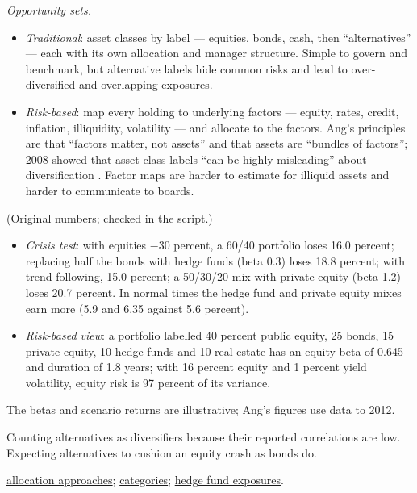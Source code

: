 \begin{qfdefinition}
\emph{Opportunity sets.}
\begin{itemize}
\item \emph{Traditional}: asset classes by label --- equities, bonds, cash, then ``alternatives'' --- each with its own allocation and manager structure. Simple to govern and benchmark, but alternative labels hide common risks and lead to over-diversified and overlapping exposures.
\item \emph{Risk-based}: map every holding to underlying factors --- equity, rates, credit, inflation, illiquidity, volatility --- and allocate to the factors. Ang's principles are that ``factors matter, not assets'' and that assets are ``bundles of factors''; 2008 showed that asset class labels ``can be highly misleading'' about diversification \citep[pp.~195, 211]{s7-ang}. Factor maps are harder to estimate for illiquid assets and harder to communicate to boards.
\end{itemize}

 (Original numbers; checked in the script.)
\begin{itemize}
\item \emph{Crisis test}: with equities $-30$ percent, a 60/40 portfolio loses 16.0 percent; replacing half the bonds with hedge funds (beta 0.3) loses 18.8 percent; with trend following, 15.0 percent; a 50/30/20 mix with private equity (beta 1.2) loses 20.7 percent. In normal times the hedge fund and private equity mixes earn more (5.9 and 6.35 against 5.6 percent).
\item \emph{Risk-based view}: a portfolio labelled 40 percent public equity, 25 bonds, 15 private equity, 10 hedge funds and 10 real estate has an equity beta of 0.645 and duration of 1.8 years; with 16 percent equity and 1 percent yield volatility, equity risk is 97 percent of its variance.
\end{itemize}

 The betas and scenario returns are illustrative; Ang's figures use data to 2012.

 Counting alternatives as diversifiers because their reported correlations are low. Expecting alternatives to cushion an equity crash as bonds do.

 \hyperref[meth:alternatives-allocation-approaches]{allocation approaches}; \hyperref[def:alternative-investment-categories]{categories}; \hyperref[meth:hedge-fund-factor-exposures]{hedge fund exposures}.

\end{qfdefinition}

